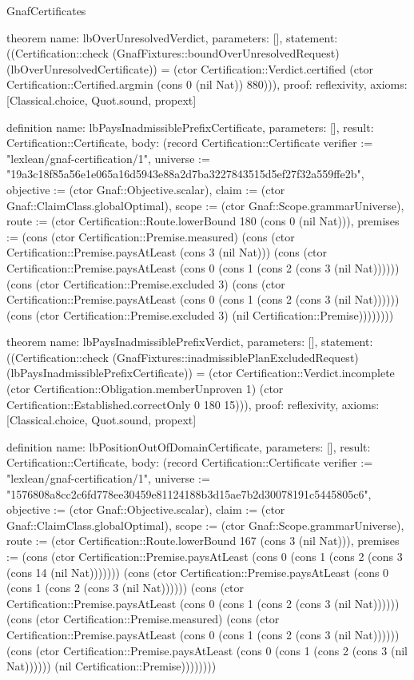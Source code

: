 \begin{lexlean}{GnafCertificates}
\begin{semanticmodule}
theorem{
  name: lbOverUnresolvedVerdict,
  parameters: [],
  statement: ((Certification::check (GnafFixtures::boundOverUnresolvedRequest) (lbOverUnresolvedCertificate)) = (ctor Certification::Verdict.certified (ctor Certification::Certified.argmin (cons 0 (nil Nat)) 880))),
  proof: reflexivity{},
  axioms: [Classical.choice, Quot.sound, propext]
}

definition{
  name: lbPaysInadmissiblePrefixCertificate,
  parameters: [],
  result: Certification::Certificate,
  body: (record Certification::Certificate {verifier := "lexlean/gnaf-certification/1", universe := "19a3c18f85a56e1e065a16d5943e88a2d7ba3227843515d5ef27f32a559ffe2b", objective := (ctor Gnaf::Objective.scalar), claim := (ctor Gnaf::ClaimClass.globalOptimal), scope := (ctor Gnaf::Scope.grammarUniverse), route := (ctor Certification::Route.lowerBound 180 (cons 0 (nil Nat))), premises := (cons (ctor Certification::Premise.measured) (cons (ctor Certification::Premise.paysAtLeast (cons 3 (nil Nat))) (cons (ctor Certification::Premise.paysAtLeast (cons 0 (cons 1 (cons 2 (cons 3 (nil Nat)))))) (cons (ctor Certification::Premise.excluded 3) (cons (ctor Certification::Premise.paysAtLeast (cons 0 (cons 1 (cons 2 (cons 3 (nil Nat)))))) (cons (ctor Certification::Premise.excluded 3) (nil Certification::Premise)))))))})
}

theorem{
  name: lbPaysInadmissiblePrefixVerdict,
  parameters: [],
  statement: ((Certification::check (GnafFixtures::inadmissiblePlanExcludedRequest) (lbPaysInadmissiblePrefixCertificate)) = (ctor Certification::Verdict.incomplete (ctor Certification::Obligation.memberUnproven 1) (ctor Certification::Established.correctOnly 0 180 15))),
  proof: reflexivity{},
  axioms: [Classical.choice, Quot.sound, propext]
}

definition{
  name: lbPositionOutOfDomainCertificate,
  parameters: [],
  result: Certification::Certificate,
  body: (record Certification::Certificate {verifier := "lexlean/gnaf-certification/1", universe := "1576808a8cc2c6fd778ee30459e81124188b3d15ae7b2d30078191c5445805c6", objective := (ctor Gnaf::Objective.scalar), claim := (ctor Gnaf::ClaimClass.globalOptimal), scope := (ctor Gnaf::Scope.grammarUniverse), route := (ctor Certification::Route.lowerBound 167 (cons 3 (nil Nat))), premises := (cons (ctor Certification::Premise.paysAtLeast (cons 0 (cons 1 (cons 2 (cons 3 (cons 14 (nil Nat))))))) (cons (ctor Certification::Premise.paysAtLeast (cons 0 (cons 1 (cons 2 (cons 3 (nil Nat)))))) (cons (ctor Certification::Premise.paysAtLeast (cons 0 (cons 1 (cons 2 (cons 3 (nil Nat)))))) (cons (ctor Certification::Premise.measured) (cons (ctor Certification::Premise.paysAtLeast (cons 0 (cons 1 (cons 2 (cons 3 (nil Nat)))))) (cons (ctor Certification::Premise.paysAtLeast (cons 0 (cons 1 (cons 2 (cons 3 (nil Nat)))))) (nil Certification::Premise)))))))})
}


\end{semanticmodule}
\end{lexlean}
